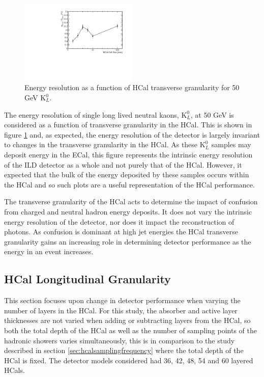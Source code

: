 \begin{figure}
\centering
\includegraphics[width=0.5\textwidth]{OptimisationStudies/Plots/EnergyResolution/ER_vs_HCalCellSize_50GeVKaon0L.pdf}
\caption[Energy resolution as a function of HCal transverse granularity for 50 GeV $\text{K}^{0}_{L}$.]{Energy resolution as a function of HCal transverse granularity for 50 GeV $\text{K}^{0}_{L}$.}
\label{fig:hcalcellskaon}
\end{figure}

The energy resolution of single long lived neutral kaons, $\text{K}^{0}_{L}$, at 50 GeV is considered as a function of transverse granularity in the HCal.  This is shown in figure \ref{fig:hcalcellskaon} and, as expected, the energy resolution of the detector is largely invariant to changes in the transverse granularity in the HCal.  As these $\text{K}^{0}_{L}$ samples may deposit energy in the ECal, this figure represents the intrinsic energy resolution of the ILD detector as a whole and not purely that of the HCal.  However, it expected that the bulk of the energy deposited by these samples occurs within the HCal and so such plots are a useful representation of the HCal performance.  

The transverse granularity of the HCal acts to determine the impact of confusion from charged and neutral hadron energy deposits.  It does not vary the intrinsic energy resolution of the detector, nor does it impact the reconstruction of photons.  As confusion is dominant at high jet energies the HCal transverse granularity gains an increasing role in determining detector performance as the energy in an event increases. 


\subsection{HCal Longitudinal Granularity}
\label{sec:hcalnlayers}

This section focuses upon change in detector performance when varying the number of layers in the HCal.  For this study, the absorber and active layer thicknesses are not varied when adding or subtracting layers from the HCal, so both the total depth of the HCal as well as the number of sampling points of the hadronic showers varies simultaneously, this is in comparison to the study described in section \ref{sec:hcalsamplingfrequency} where the total depth of the HCal is fixed.  The detector models considered had 36, 42, 48, 54 and 60 layered HCals.  

